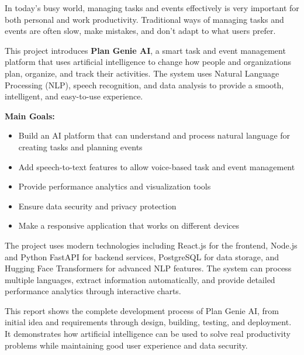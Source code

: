 \documentclass[12pt,a4paper]{article}
\begin{document}
\vspace{1cm}

In today's busy world, managing tasks and events effectively is very important for both personal and work productivity. Traditional ways of managing tasks and events are often slow, make mistakes, and don't adapt to what users prefer.

This project introduces \textbf{Plan Genie AI}, a smart task and event management platform that uses artificial intelligence to change how people and organizations plan, organize, and track their activities. The system uses Natural Language Processing (NLP), speech recognition, and data analysis to provide a smooth, intelligent, and easy-to-use experience.

\vspace{0.5cm}

\textbf{Main Goals:}

\begin{itemize}
    \item Build an AI platform that can understand and process natural language for creating tasks and planning events
    \item Add speech-to-text features to allow voice-based task and event management
    \item Provide performance analytics and visualization tools
    \item Ensure data security and privacy protection
    \item Make a responsive application that works on different devices
\end{itemize}

\vspace{0.5cm}

The project uses modern technologies including React.js for the frontend, Node.js and Python FastAPI for backend services, PostgreSQL for data storage, and Hugging Face Transformers for advanced NLP features. The system can process multiple languages, extract information automatically, and provide detailed performance analytics through interactive charts.

\vspace{0.5cm}

This report shows the complete development process of Plan Genie AI, from initial idea and requirements through design, building, testing, and deployment. It demonstrates how artificial intelligence can be used to solve real productivity problems while maintaining good user experience and data security.
\end{document}
